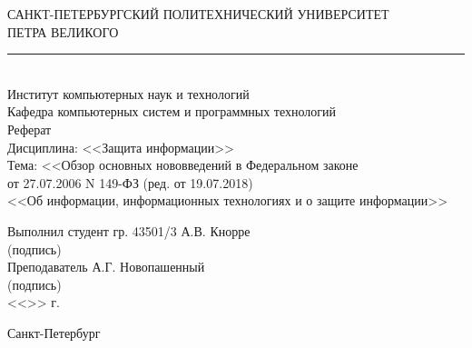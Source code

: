 \begin{titlepage}
\begin{center}
	САНКТ-ПЕТЕРБУРГСКИЙ ПОЛИТЕХНИЧЕСКИЙ УНИВЕРСИТЕТ\\ ПЕТРА ВЕЛИКОГО\\[0.3cm]
	\par\noindent\rule{10cm}{0.4pt}\\[0.3cm]
	Институт компьютерных наук и технологий \\[0.3cm]
	Кафедра компьютерных систем и программных технологий\\[4cm]
	
	Реферат\\[3mm]
	Дисциплина: <<Защита информации>>\\[3mm]
	Тема: <<Обзор основных нововведений в Федеральном законе\\ от 27.07.2006 N 149-ФЗ (ред. от 19.07.2018)\\ <<Об информации, информационных технологиях и о защите информации>>\\[7cm]
\end{center}

\begin{flushleft}
	\hspace*{5mm} Выполнил студент гр. 43501/3  \hspace*{1.5cm}\sign[3cm]\hfill А.В. Кнорре\\
	\hspace*{9.4cm} (подпись)\\[3mm]
	\hspace*{5mm} Преподаватель \hspace*{5.0cm}\sign[3cm]\hfill А.Г. Новопашенный\\
	\hspace*{9.4cm} (подпись)\\[5mm]
	\hspace*{11.1cm} <<\sign[7mm]>> \sign[27mm] \the\year\hspace{1mm} г.
\end{flushleft}

\vfill

\begin{center}
	Санкт-Петербург\\
	\the\year
\end{center}
\end{titlepage}
\addtocounter{page}{1}